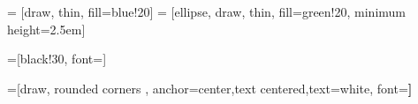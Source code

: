 
\usepackage[utf8]{inputenc}
\usepackage{lmodern}
\usepackage[T1]{fontenc}


\usepackage{array}
\usepackage{mathtools}%
\usepackage{wasysym}
\usepackage{amsfonts}
\usepackage{amssymb, amsbsy}
\usepackage[utf8]{inputenc}
\usepackage{graphicx}
\usepackage{multimedia}
\usepackage{multicol}
\usepackage{multirow}
\usepackage{fourier}
\usepackage{makecell}






\usepackage{tikz}
\usetikzlibrary{shapes,arrows,shadows,calc, angles}
\usetikzlibrary{arrows,shapes}
\usetikzlibrary{positioning}

\usetikzlibrary{decorations, decorations.pathreplacing}


\usepackage{verbatim}

 = [draw, thin, fill=blue!20]
 = [ellipse, draw, thin, fill=green!20, minimum height=2.5em]


\def\onlystyle<#1>#2#3{%
    \alt<#1>{%
        \tikzset{#2/.style = {#3}}
    }{%
        \tikzset{#2/.style = {}}
    }%
}

















\newcommand{\txw}{\textwidth}
\newcommand{\txh}{\textheight}
\newcommand{\midX}{0.5\textwidth}
\newcommand{\midY}{0.5\textheight}

\newcommand{\xPageNumber}{105mm}
\newcommand{\yPageNumber}{3mm}
=[black!30, font=\small]
\newcommand{\nodePageNumber}{ \node[stylePageNumber] at (\xPageNumber, \yPageNumber) {\insertframenumber} ; }

=[draw, rounded corners ,
anchor=center,text centered,text=white, font=\bfseries] %

